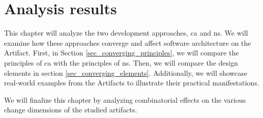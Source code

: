 \chapter{Analysis results} \label{chap_evaluation}

This chapter will analyze the two development approaches, \gls{ca} and \gls{ns}. We will
examine how these approaches converge and affect software architecture on the Artifact.
First, in Section \ref{sec_converging_principles}, we will compare the principles of
\gls{ca} with the principles of \gls{ns}. Then, we will compare the design elements in
section \ref{sec_converging_elements}. Additionally, we will showcase real-world examples
from the Artifacts to illustrate their practical manifestations.

We will finalize this chapter by analyzing combinatorial effects on the various change
dimensions of the studied artifacts.







